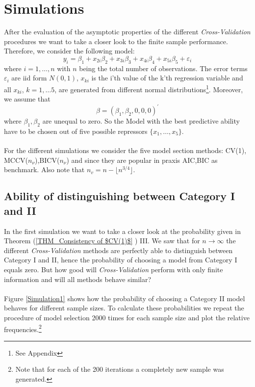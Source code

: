 \documentclass[Research_Module_ES.tex]{subfiles}
\begin{document}
\section{Simulations}
After the evaluation of the asymptotic properties of the different \textit{Cross-Validation} procedures we want to take a closer look to the finite sample performance. Therefore, we consider the following model:
\[
	y_i=\beta_1+x_{2i}\beta_2+x_{3i}\beta_3+x_{4i}\beta_4+x_{5i}\beta_5+\varepsilon_i
\]
where $i=1,\ldots,n$ with $n$ being the total number of observations. The error terms $\varepsilon_i$ are iid form $N(0,1)$,  $x_{ki}$ is the i'th value of the k'th regression variable and all $x_{ki}$, $k=1,\ldots5$, are generated from different normal distributions\footnote{See Appendix}. Moreover, we assume that
\[
	\beta=(\beta_1,\beta_2,0,0,0)^\prime
\]
where $\beta_1,\beta_2$ are unequal to zero. So the Model with the best predictive ability have to be chosen out of five possible repressors $\{x_1,\ldots,x_5\}$. \\
\\
For the different simulations we consider the five model section methods: CV(1), MCCV($n_\nu$),BICV($n_\nu$) and since they are popular in praxis AIC,BIC as benchmark. Also note that $n_v=n-\lfloor n^{3/4}\rfloor$.

\subsection{Ability of distinguishing between Category I and II }
In the first simulation we want to take a closer look at the probability given in Theorem (\ref{THM_Consistency of $CV(1)$} ) III. We saw that for $n\to\infty$ the different \textit{Cross-Validation} methods are perfectly able to distinguish between Category I and II, hence the probability of choosing a model from Category I equals zero. But how good will \textit{Cross-Validation} perform with only finite information and will all methods behave similar?\\
\\
Figure \ref{Simulation1} shows how the probability of choosing a Category II model behaves for different sample sizes. To calculate these probabilities we repeat the procedure of model selection 2000 times for each sample size and plot the relative frequencies.\footnote{Note that for each of the 200 iterations a completely new sample was generated.}
\end{document}
